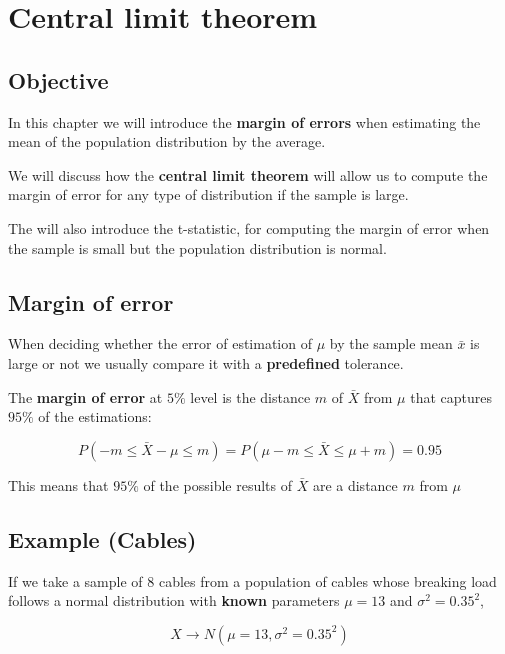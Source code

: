 \documentclass[
]{book}
\begin{document}
\hypertarget{central-limit-theorem}{%
\chapter{Central limit theorem}\label{central-limit-theorem}}

\hypertarget{objective-6}{%
\section{Objective}\label{objective-6}}

In this chapter we will introduce the \textbf{margin of errors} when estimating the mean of the population distribution by the average.

We will discuss how the \textbf{central limit theorem} will allow us to compute the margin of error for any type of distribution if the sample is large.

The will also introduce the t-statistic, for computing the margin of error when the sample is small but the population distribution is normal.

\hypertarget{margin-of-error}{%
\section{Margin of error}\label{margin-of-error}}

When deciding whether the error of estimation of \(\mu\) by the sample mean \(\bar{x}\) is large or not we usually compare it with a \textbf{predefined} tolerance.

The \textbf{margin of error} at \(5\%\) level is the distance \(m\) of \(\bar{X}\) from \(\mu\) that captures \(95\%\) of the estimations:

\[P(-m \leq \bar{X}-\mu \leq m)=P(\mu-m \leq \bar{X} \leq\mu + m)=0.95\]

This means that \(95\%\) of the possible results of \(\bar{X}\) are a distance \(m\) from \(\mu\)

\hypertarget{example-cables}{%
\section{Example (Cables)}\label{example-cables}}

If we take a sample of \(8\) cables from a population of cables whose breaking load follows a normal distribution with \textbf{known} parameters \(\mu=13\) and \(\sigma^2=0.35^2\),

\[X \rightarrow N(\mu=13, \sigma^2=0.35^2)\]
\end{document}

